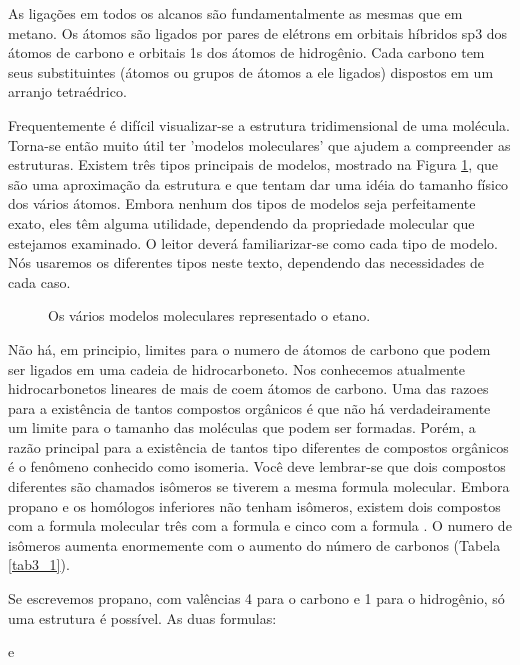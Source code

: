 As ligações em todos os alcanos são fundamentalmente as mesmas que em metano. Os átomos são ligados por pares de elétrons em orbitais híbridos sp3 dos átomos de carbono e orbitais 1s dos átomos de hidrogênio. Cada carbono tem seus substituintes (átomos ou grupos de átomos a ele ligados) dispostos em um arranjo tetraédrico.

Frequentemente é difícil visualizar-se a estrutura tridimensional de uma molécula. Torna-se então muito útil ter 'modelos moleculares' que ajudem a compreender as estruturas. Existem três tipos principais de modelos, mostrado na Figura \ref{fig3_1}, que são uma aproximação da estrutura  e que tentam dar uma idéia do tamanho físico dos vários átomos. Embora nenhum dos tipos de modelos seja perfeitamente exato, eles têm alguma utilidade, dependendo da propriedade molecular que estejamos examinado. O leitor deverá familiarizar-se como cada tipo de modelo. Nós usaremos os diferentes tipos neste texto, dependendo das necessidades de cada caso. 

\begin{figure}[H]
    \centering
    \caption{Os vários modelos moleculares representado o etano.}
    \label{fig3_1}
\end{figure}

Não há, em principio, limites para o numero de átomos de carbono que podem ser ligados em uma cadeia de hidrocarboneto. Nos conhecemos atualmente hidrocarbonetos lineares de mais de coem átomos de carbono. Uma das razoes para a existência de tantos compostos orgânicos é que não há verdadeiramente um limite para o tamanho das moléculas que podem ser formadas. Porém, a razão principal para a existência de tantos tipo diferentes de compostos orgânicos é o fenômeno conhecido como isomeria. Você deve lembrar-se que dois compostos diferentes são chamados isômeros se tiverem a mesma formula molecular. Embora propano e os homólogos inferiores não tenham isômeros, existem dois compostos com a formula molecular  três com a formula  e cinco com a formula . O numero de isômeros aumenta enormemente com o aumento do número de carbonos (Tabela \ref{tab3_1}).

Se escrevemos propano,  com valências 4 para o carbono e 1 para o hidrogênio, só uma estrutura é possível. As duas formulas:

\begin{tightcenter}
    \qquad e \qquad
\end{tightcenter}

